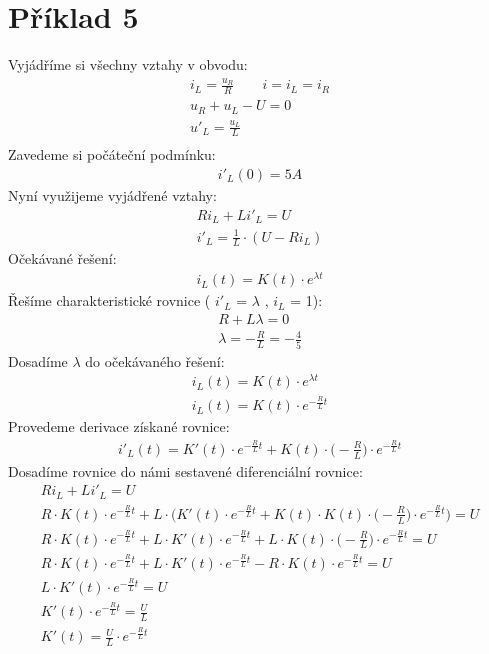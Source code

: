 \section{Příklad 5}
Vyjádříme si všechny vztahy v obvodu:\\
\begin{gather*}
	i_L = \frac{u_R}{R} \qquad i = i_L = i_R\\
    u_R + u_L - U = 0\\
    u'_{L} = \frac{u_L}{L}\\
\end{gather*}
Zavedeme si počáteční podmínku:\\
\begin{gather*}
    i'_{L}(0) = 5A
\end{gather*}
Nyní využijeme vyjádřené vztahy:\\
\begin{gather*}
    Ri_L + Li'_L = U\\
    i'_L = \frac{1}{L} \cdot (U - Ri_L) 
\end{gather*}
Očekávané řešení:\\
\begin{gather*}
    i_L(t) = K(t) \cdot e^{\lambda t}
\end{gather*}
Řešíme charakteristické rovnice ( ${i'_L}$ = ${\lambda}$ , ${i_L}$ = 1):\\
\begin{gather*}
    R + L \lambda = 0\\
    \lambda = -\frac{R}{L} = -\frac{4}{5}
\end{gather*}
Dosadíme ${ \lambda}$ do očekávaného řešení:\\
\begin{gather*}
    i_L(t) = K(t) \cdot e^{\lambda t}\\
    i_L(t) = K(t) \cdot e^{-\frac{R}{L} t}
\end{gather*}
Provedeme derivace získané rovnice:
\begin{gather*}
    i'_L(t) = K'(t) \cdot e^{-\frac{R}{L} t} + K(t) \cdot \bigg(-\frac{R}{L}\bigg) \cdot e^{-\frac{R}{L} t}
\end{gather*}
Dosadíme rovnice do námi sestavené diferenciální rovnice:
\begin{gather*}
    Ri_L + Li'_L = U\\
    R \cdot K(t) \cdot e^{-\frac{R}{L}t} + L \cdot \bigg(K'(t) \cdot e^{-\frac{R}{L}t} + K(t) \cdot K(t) \cdot \bigg(-\frac{R}{L}\bigg) \cdot e^{-\frac{R}{L}t} \bigg) = U\\
    R \cdot K(t) \cdot e^{-\frac{R}{L}t} + L \cdot K'(t) \cdot e^{-\frac{R}{L}t} + L \cdot K(t) \cdot \bigg(-\frac{R}{L}\bigg) \cdot e^{-\frac{R}{L}t} = U\\
    R \cdot K(t) \cdot e^{-\frac{R}{L}t} + L \cdot K'(t) \cdot e^{-\frac{R}{L}t} - R \cdot K(t) \cdot e^{-\frac{R}{L}t} = U\\
    L \cdot K'(t) \cdot e^{-\frac{R}{L}t} = U\\
    K'(t) \cdot e^{-\frac{R}{L}t} = \frac{U}{L}\\
    K'(t) = \frac{U}{L} \cdot e^{-\frac{R}{L}t}
\end{gather*}
